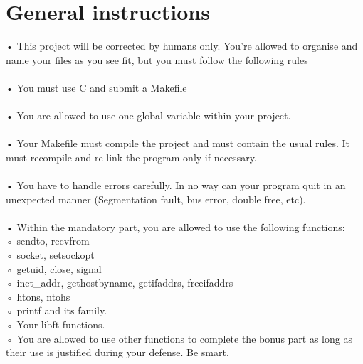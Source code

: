 \documentclass{42-en}
\begin{document}
\chapter{General instructions}

    • This project will be corrected by humans only. You’re allowed to organise and name your files as you see fit, but you must follow the following rules\\
    \\
    • You must use C and submit a Makefile\\
    \\
    • You are allowed to use one global variable within your project.\\
    \\
    • Your Makefile must compile the project and must contain the usual rules. It must recompile and re-link the program only if necessary.\\
    \\
    • You have to handle errors carefully. In no way can your program quit in an unexpected manner (Segmentation fault, bus error, double free, etc).\\
    \\
    • Within the mandatory part, you are allowed to use the following functions:\\

          ◦ sendto, recvfrom\\

          ◦ socket, setsockopt\\  

          ◦ getuid, close, signal\\

          ◦ inet\_addr, gethostbyname, getifaddrs, freeifaddrs\\ 

          ◦ htons, ntohs\\  

          ◦ printf and its family.\\  

          ◦ Your libft functions.\\    

          ◦ You are allowed to use other functions to complete the bonus part as long as their use is justified during your defense. Be smart.\\




\end{document}
